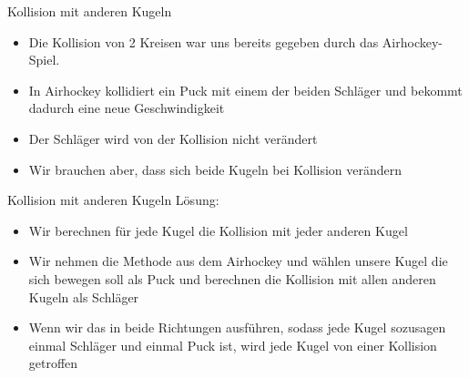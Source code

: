 \begin{frame}{Kollision mit anderen Kugeln}
\begin{itemize}
	\item Die Kollision von 2 Kreisen war uns bereits gegeben durch das Airhockey-Spiel.
	\item In Airhockey kollidiert ein Puck mit einem der beiden Schläger und bekommt dadurch eine neue Geschwindigkeit
	\item Der Schläger wird von der Kollision nicht verändert
	\item Wir brauchen aber, dass sich beide Kugeln bei Kollision verändern
\end{itemize}
\end{frame}
\begin{frame}{Kollision mit anderen Kugeln}
Lösung:
\begin{itemize}
	\item Wir berechnen für jede Kugel die Kollision mit jeder anderen Kugel
	\item Wir nehmen die Methode aus dem Airhockey und wählen unsere Kugel die sich bewegen soll als Puck und berechnen die Kollision mit allen anderen Kugeln als Schläger
	\item Wenn wir das in beide Richtungen ausführen, sodass jede Kugel sozusagen einmal Schläger und einmal Puck ist, wird jede Kugel von einer Kollision getroffen 
\end{itemize}
\end{frame}